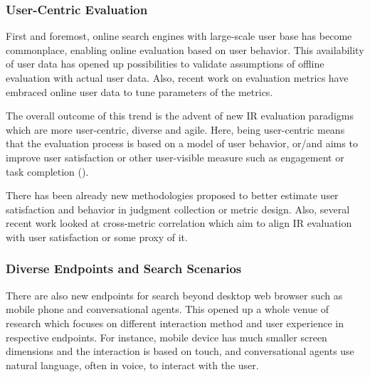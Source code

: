 \documentclass[openany]{now} %
\newcommand{\note}[1]{\textit{(#1)}}
\begin{document}
\subsubsection{User-Centric Evaluation}
First and foremost, online search engines with large-scale user base has become commonplace, enabling online evaluation based on user behavior. This availability of user data has opened up possibilities to validate assumptions of offline evaluation with actual user data. Also, recent work on evaluation metrics \cite{CarteretteKY11, Carterette:2012} have embraced online user data to tune parameters of the metrics.

The overall outcome of this trend is the advent of new IR evaluation paradigms which are more user-centric, diverse and agile. Here, being user-centric means that the evaluation process is based on a model of user behavior, or/and aims to improve user satisfaction or other user-visible measure such as engagement or task completion (\cite{scholer13}). 

There has been already new methodologies proposed to better estimate user satisfaction and behavior in judgment collection \cite{VermaY16, VermaYC16} or metric design\cite{YilmazSCR10, CarteretteKY11, ChapelleMZG09}. Also, several recent work looked at cross-metric correlation \cite{Al-Maskari2007} \cite{radl:comp10} which aim to align IR evaluation with user satisfaction or some proxy of it.


\subsubsection{Diverse Endpoints and Search Scenarios}

There are also new endpoints for search beyond desktop web browser such as mobile phone and conversational agents. This opened up a whole venue of research which focuses on different interaction method and user experience in respective endpoints. For instance, mobile device has much smaller screen dimensions and the interaction is based on touch, and conversational agents use natural language, often in voice, to interact with the user.
\end{document}
